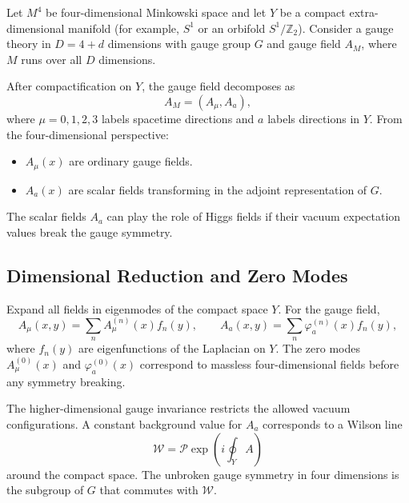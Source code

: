 \begin{hypothesis}
\label{hyp:gauge-higgs-unification-setup}
Let \(M^4\) be four-dimensional Minkowski space and let \(Y\) be a compact
extra-dimensional manifold (for example, \(S^1\) or an orbifold \(S^1/\mathbb{Z}_2\)).
Consider a gauge theory in \(D = 4 + d\) dimensions with gauge group \(G\) and
gauge field \(A_M\), where \(M\) runs over all \(D\) dimensions.

After compactification on \(Y\), the gauge field decomposes as
\begin{equation}
  A_M = (A_\mu, A_a),
  \label{eq:gauge-field-decomposition}
\end{equation}
where \(\mu = 0,1,2,3\) labels spacetime directions and \(a\) labels directions
in \(Y\).  From the four-dimensional perspective:
\begin{itemize}
\item \(A_\mu(x)\) are ordinary gauge fields.
\item \(A_a(x)\) are scalar fields transforming in the adjoint representation of \(G\).
\end{itemize}
\end{hypothesis}

The scalar fields \(A_a\) can play the role of Higgs fields if their vacuum
expectation values break the gauge symmetry.

\subsection{Dimensional Reduction and Zero Modes}

Expand all fields in eigenmodes of the compact space \(Y\).  For the gauge field,
\begin{equation}
  A_\mu(x,y) = \sum_n A_\mu^{(n)}(x) f_n(y),
  \qquad
  A_a(x,y) = \sum_n \varphi_a^{(n)}(x) f_n(y),
  \label{eq:gauge-field-mode-expansion}
\end{equation}
where \(f_n(y)\) are eigenfunctions of the Laplacian on \(Y\).  The zero modes
\(A_\mu^{(0)}(x)\) and \(\varphi_a^{(0)}(x)\) correspond to massless
four-dimensional fields before any symmetry breaking.

The higher-dimensional gauge invariance restricts the allowed vacuum configurations.
A constant background value for \(A_a\) corresponds to a Wilson line
\begin{equation}
  \mathcal{W} = \mathcal{P} \exp\!\left( i \oint_Y A \right)
  \label{eq:wilson-line}
\end{equation}
around the compact space.  The unbroken gauge symmetry in four dimensions is the
subgroup of \(G\) that commutes with \(\mathcal{W}\).

